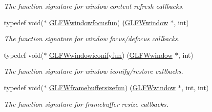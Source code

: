 \begin{DoxyCompactItemize}
\begin{DoxyCompactList}\small\item\em The function signature for window content refresh callbacks. \end{DoxyCompactList}\item 
typedef void($\ast$ \hyperlink{group__window_ga58be2061828dd35080bb438405d3a7e2}{G\+L\+F\+Wwindowfocusfun}) (\hyperlink{group__window_ga3c96d80d363e67d13a41b5d1821f3242}{G\+L\+F\+Wwindow} $\ast$, int)
\begin{DoxyCompactList}\small\item\em The function signature for window focus/defocus callbacks. \end{DoxyCompactList}\item 
typedef void($\ast$ \hyperlink{group__window_gad2d4e4c3d28b1242e742e8268b9528af}{G\+L\+F\+Wwindowiconifyfun}) (\hyperlink{group__window_ga3c96d80d363e67d13a41b5d1821f3242}{G\+L\+F\+Wwindow} $\ast$, int)
\begin{DoxyCompactList}\small\item\em The function signature for window iconify/restore callbacks. \end{DoxyCompactList}\item 
typedef void($\ast$ \hyperlink{group__window_ga3e218ef9ff826129c55a7d5f6971a285}{G\+L\+F\+Wframebuffersizefun}) (\hyperlink{group__window_ga3c96d80d363e67d13a41b5d1821f3242}{G\+L\+F\+Wwindow} $\ast$, int, int)
\begin{DoxyCompactList}\small\item\em The function signature for framebuffer resize callbacks. \end{DoxyCompactList}\end{DoxyCompactItemize}
